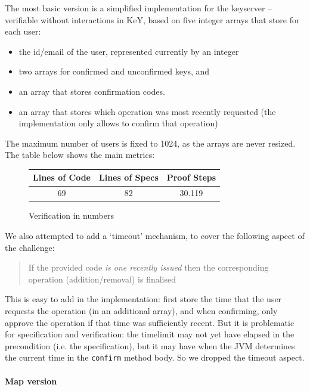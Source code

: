 \documentclass{llncs}
\begin{document}
The most basic version is a simplified implementation for the keyserver --
verifiable without interactions in KeY, based on five integer arrays that store
for each user:
%
\begin{itemize}
  \item the id/email of the user, represented currently by an integer
  \item two arrays for confirmed and unconfirmed keys, and
  \item an array that stores confirmation codes.
  \item an array that stores which operation was most recently requested (the
    implementation only allows to confirm that operation)
\end{itemize}
%
The maximum number of users is fixed to 1024, as the arrays are never resized.
The table below shows the main metrics:

\begin{figure}
  \centering
  \begin{tabular}{ |c|c|c| }
    \hline
    Lines of Code & Lines of Specs & Proof Steps \\
    \hline
    69 & 82 & 30.119 \\
    \hline
  \end{tabular}
  \caption{Verification in numbers}
  \label{fig:numbers}
\end{figure}


We also attempted to add a `timeout' mechanism, to cover the following aspect of the challenge:
\begin{quote}
  If the provided code \emph{is one recently issued} then the corresponding operation (addition/removal) is finalised
\end{quote}
This is easy to add in the implementation: first store the time that the user requests the operation (in an additional array), and when confirming, only approve the operation if that time was sufficiently recent. But it is problematic for specification and verification: the timelimit may not yet have elapsed in the precondition (i.e. the specification), but it may have when the JVM determines the current time in the \verb|confirm| method body.
So we dropped the timeout aspect.

\paragraph{Map version}
\end{document}
